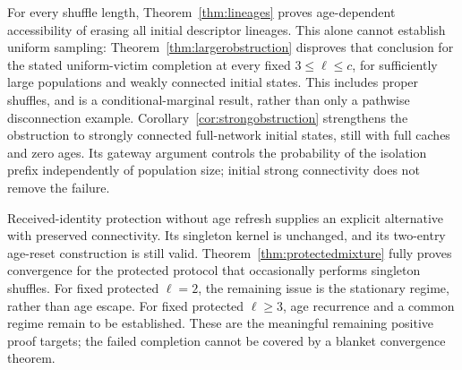 \documentclass[11pt]{article}
\begin{document}
For every shuffle length, Theorem~\ref{thm:lineages} proves
age-dependent accessibility of erasing all initial descriptor
lineages. This alone cannot establish uniform sampling:
Theorem~\ref{thm:largerobstruction} disproves that conclusion
for the stated uniform-victim completion at every fixed
$3\le\ell\le c$, for sufficiently large populations and
weakly connected initial states. This includes proper shuffles,
and is a conditional-marginal result, rather than only a
pathwise disconnection example.
Corollary~\ref{cor:strongobstruction} strengthens the obstruction
to strongly connected full-network initial states, still with
full caches and zero ages. Its gateway argument controls the
probability of the isolation prefix independently of population
size; initial strong connectivity does not remove the failure.

Received-identity protection without age refresh supplies an explicit alternative
with preserved connectivity. Its singleton kernel is unchanged,
and its two-entry age-reset construction is still valid.
Theorem~\ref{thm:protectedmixture} fully proves convergence
for the protected protocol that occasionally performs singleton
shuffles. For fixed protected $\ell=2$, the remaining issue is
the stationary regime, rather than age escape. For fixed
protected $\ell\ge3$, age recurrence and a common regime remain
to be established. These are the meaningful remaining positive
proof targets; the failed completion cannot be covered by a
blanket convergence theorem.
\end{document}
